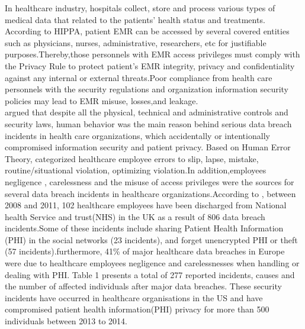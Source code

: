 In healthcare industry, hospitals collect, store and process various types of medical data that related to the patients' health status and treatments. According to HIPPA, patient EMR can be accessed by several covered entities such as physicians, nurses, administrative, researchers, etc for justifiable purposes.Thereby,those personnels with EMR access privileges must comply with the Privacy Rule to protect patient's EMR integrity, privacy and confidentiality against any internal or external threats.Poor compliance from health care personnels with the security regulations and organization information security policies may 
lead to EMR misuse, losses,and leakage.\\
\citet{Kamoun} argued that despite all the physical, technical and administrative controls and security laws, human behavior was the main reason behind serious data breach incidents in health care organizations, which accidentally or intentionally compromised information security and patient privacy. Based on Human Error Theory,\citet{Kamoun} categorized  healthcare employee errors to slip, lapse, mistake, routine/situational violation, optimizing violation.In addition,employees negligence , carelessness and the misuse of access privileges were the sources for several data breach incidents in healthcare organizations.According to \cite{Kamoun}, between 2008 and 2011, 102 healthcare employees have been discharged from National health Service and trust(NHS) in the UK as a result of 806 data breach incidents.Some of these incidents include sharing Patient Health Information (PHI) in the social networks (23 incidents), and forget unencrypted PHI or theft (57 incidents).furthermore, 41\% of major healthcare data breaches in Europe were due to healthcare employees  negligence and carelessnesses when handling or dealing with PHI\cite{Kierkegaard2012,Kamoun}. Table 1 presents a total of 277 reported incidents, causes and the number of affected individuals after major data breaches. These security incidents have occurred in healthcare organisations in the US and have compromised patient health information(PHI) privacy for more than 500 individuals between 2013 to 2014.
\graphicspath{ {image/} }
